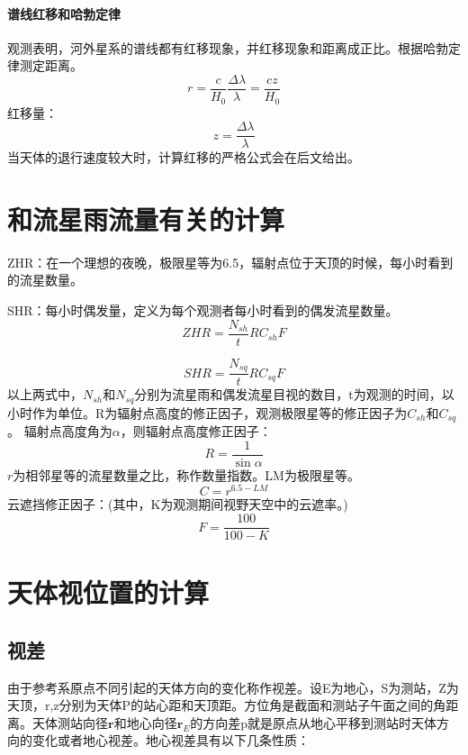 \paragraph{谱线红移和哈勃定律}
观测表明，河外星系的谱线都有红移现象，并红移现象和距离成正比。根据哈勃定律测定距离。
\begin{equation}
	r=\frac{c}{H_{0}}\frac{\Delta\lambda}{\lambda}=\frac{cz}{H_{0}}
\end{equation}
红移量：
\begin{equation}
	z=\frac{\Delta\lambda}{\lambda}
\end{equation}
当天体的退行速度较大时，计算红移的严格公式会在后文给出。
\section{和流星雨流量有关的计算}

ZHR：在一个理想的夜晚，极限星等为6.5，辐射点位于天顶的时候，每小时看到的流星数量。

SHR：每小时偶发量，定义为每个观测者每小时看到的偶发流星数量。
\begin{equation}
	ZHR=\frac{N_{sh}}{t}RC_{sh}F
\end{equation}

\begin{equation}
	SHR=\frac{N_{sq}}{t}RC_{sq}F
\end{equation}
以上两式中，$N_{sh}$和$N_{sq}$分别为流星雨和偶发流星目视的数目，t为观测的时间，以小时作为单位。R为辐射点高度的修正因子，观测极限星等的修正因子为$C_{sh}$和$C_{sq}$。
辐射点高度角为$\alpha$，则辐射点高度修正因子：
\begin{equation}
	R=\frac{1}{\sin \alpha}
\end{equation}
$r$为相邻星等的流星数量之比，称作数量指数。LM为极限星等。
\begin{equation}
	C=r^{6.5-LM}
\end{equation}
云遮挡修正因子：(其中，K为观测期间视野天空中的云遮率。)
\begin{equation}
	F=\frac{100}{100-K}
\end{equation}
\section{天体视位置的计算}
\subsection{视差}
由于参考系原点不同引起的天体方向的变化称作视差。设E为地心，S为测站，Z为天顶，r,z分别为天体P的站心距和天顶距。方位角是截面和测站子午面之间的角距离。天体测站向径$\boldsymbol{r}$和地心向径$\boldsymbol{r}_{E}$的方向差p就是原点从地心平移到测站时天体方向的变化或者地心视差。地心视差具有以下几条性质：

